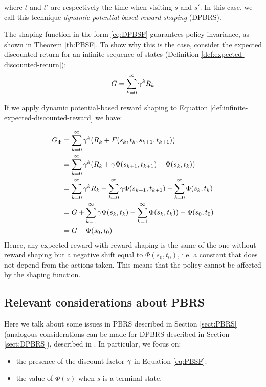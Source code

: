 where $t$ and $t'$ are respectively the time when visiting $s$ and $s'$. In this case, we call this technique \emph{dynamic potential-based reward shaping} (DPBRS).

The shaping function in the form \ref{eq:DPBSF} guarantees policy invariance, as shown in Theorem \ref{th:PBSF}. To show why this is the case, consider the expected discounted return for an infinite sequence of states (Definition \ref{def:expected-discounted-return}):
\begin{equation}\label{def:infinite-expected-discounted-reward}
G = \sum_{k=0}^\infty \gamma^{k}R_k
\end{equation}

If we apply dynamic potential-based reward shaping to Equation \ref{def:infinite-expected-discounted-reward} we have:

\begin{align*}
G_{\Phi} &= \sum_{k=0}^\infty \gamma^{k} (R_k + F(s_k, t_k, s_{k+1}, t_{k+1}))\\
		&= \sum_{k=0}^\infty \gamma^{k} (R_k + \gamma\Phi(s_{k+1}, t_{k+1}) - \Phi(s_{k}, t_{k}) )\\
		&= \sum_{k=0}^\infty \gamma^{k} R_k + \sum_{k=0}^\infty \gamma\Phi(s_{k+1}, t_{k+1}) - \sum_{k=0}^\infty \Phi(s_{k}, t_{k}) \\
		&= G + \sum_{k=1}^\infty \gamma\Phi(s_k, t_k) - \sum_{k=1}^\infty \Phi(s_{k}, t_{k}) ) - \Phi(s_0, t_0)\\
		&= G - \Phi(s_0, t_0)
\end{align*}
Hence, any expected reward with reward shaping is the same of the one without reward shaping but a negative shift equal to $\Phi(s_0, t_0)$, i.e. a constant that does not depend from the actions taken. This means that the policy cannot be affected by the shaping function.

\subsection{Relevant considerations about PBRS}\label{sect:PBRS-no-gamma}
Here we talk about some issues in PBRS described in Section \ref{sect:PBRS} (analogous considerations can be made for DPBRS described in Section \ref{sect:DPBRS}), described in \citep{5381523, grzes2010improving, Grzes:2017:RSE:3091125.3091208}. In particular, we focus on:
\begin{itemize}
	\item the presence of the discount factor $\gamma$ in Equation \ref{eq:PBSF};
	\item the value of $\Phi(s)$ when $s$ is a terminal state.
\end{itemize}

